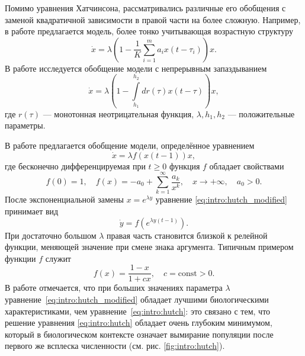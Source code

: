 Помимо уравнения Хатчинсона, рассматривались различные его обобщения с заменой квадратичной зависимости в правой части на более сложную. Например, в работе \cite{Glyzin2007} предлагается модель, более тонко учитывающая возрастную структуру
\begin{equation}
\label{eq:intro:glyzin2007}
	\dot{x}=\lambda \left(1 - \frac{1}{K}\sum\limits_{i = 1}^{m} a_i x(t-\tau_i)\right) x.
\end{equation}
%
В работе \cite{Kaschenko2012} исследуется обобщение модели с непрерывным запаздыванием
\begin{equation}
	\dot{x} = \lambda \left(1 - \int\limits_{h_1}^{h_2}dr(\tau)x(t - \tau)\right) x,
\end{equation}
где $r(\tau)$ --- монотонная неотрицательная функция, $\lambda, h_1, h_2$ --- положительные параметры.

В работе \cite{Kolesov2010} предлагается обобщение модели, определённое уравнением
\begin{equation}
\label{eq:intro:hutch_modified}
	\dot{x} = \lambda f(x(t - 1)) x,
\end{equation}
%
где бесконечно дифференцируемая при $t \geq 0$ функция $f$ обладает свойствами
\[
f(0) = 1, \quad f(x) = -a_0 + \sum\limits_{k = 1}^{\infty} \frac{a_k}{x^k}, \quad x \to +\infty, \quad a_0 > 0.
\]
После экспоненциальной замены $x = e^{\lambda y}$ уравнение \eqref{eq:intro:hutch_modified} принимает вид
\begin{equation}
\label{eq:intro:hutch_modified_exp}
\dot{y} = f(e^{\lambda y(t - 1)}).
\end{equation}
При достаточно большом $\lambda$ правая часть становится близкой к релейной функции, меняющей значение при смене знака аргумента. Типичным примером функции $f$ служит
\[
f(x) = \dfrac{1 - x}{1 + cx}, \quad c = \text{const} > 0.
\]
В работе \cite{Kolesov2010} отмечается, что при больших значениях параметра $\lambda$ уравнение~\eqref{eq:intro:hutch_modified} обладает лучшими биологическими характеристиками, чем уравнение~\eqref{eq:intro:hutch}: это связано с тем, что решение уравнения \eqref{eq:intro:hutch} обладает очень глубоким минимумом, который в биологическом контексте означает вымирание популяции после первого же всплеска численности (см. рис. \ref{fig:intro:hutch}).


